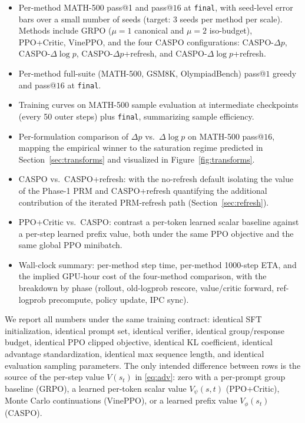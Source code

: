 \documentclass[11pt]{article}
\newcommand{\caspo}{\textsc{CASPO}}
\newcommand{\ppocritic}{PPO+Critic}
\newcommand{\grpo}{GRPO}
\newcommand{\vineppo}{VinePPO}
\begin{document}
\begin{itemize}
\item Per-method MATH-500 pass@1 and pass@$16$ at \texttt{final}, with
seed-level error bars over a small number of seeds (target: 3 seeds per
method per scale). Methods include \grpo{} ($\mu{=}1$ canonical and
$\mu{=}2$ iso-budget), \ppocritic{}, \vineppo{}, and the four \caspo{}
configurations: \caspo{}-$\Delta p$, \caspo{}-$\Delta\log p$,
\caspo{}-$\Delta p$+refresh, and \caspo{}-$\Delta\log p$+refresh.
\item Per-method full-suite (MATH-500, GSM8K, OlympiadBench) pass@$1$
greedy and pass@$16$ at \texttt{final}.
\item Training curves on MATH-500 sample evaluation at intermediate
checkpoints (every 50 outer steps) plus \texttt{final}, summarizing
sample efficiency.
\item Per-formulation comparison of $\Delta p$ vs.\ $\Delta\log p$ on
MATH-500 pass@$16$, mapping the empirical winner to the saturation
regime predicted in Section~\ref{sec:transforms} and visualized in
Figure~\ref{fig:transforms}.
\item \caspo{} vs.\ \caspo{}+refresh: with the no-refresh default
isolating the value of the Phase-1 PRM and \caspo{}+refresh
quantifying the additional contribution of the iterated PRM-refresh
path (Section~\ref{sec:refresh}).
\item \ppocritic{} vs.\ \caspo{}: contrast a per-token learned scalar
baseline against a per-step learned prefix value, both under the same
PPO objective and the same global PPO minibatch.
\item Wall-clock summary: per-method step time, per-method 1000-step ETA,
and the implied GPU-hour cost of the four-method comparison, with the
breakdown by phase (rollout, old-logprob rescore, value/critic forward,
ref-logprob precompute, policy update, IPC sync).
\end{itemize}

We report all numbers under the same training contract: identical SFT
initialization, identical prompt set, identical verifier, identical
group/response budget, identical PPO clipped objective, identical KL
coefficient, identical advantage standardization, identical max sequence
length, and identical evaluation sampling parameters. The only intended
difference between rows is the source of the per-step value $V(s_t)$ in
\eqref{eq:adv}: zero with a per-prompt group baseline (\grpo{}), a learned
per-token scalar value $V_\psi(s,t)$ (\ppocritic{}), Monte Carlo
continuations (\vineppo{}), or a learned prefix value $V_\phi(s_t)$
(\caspo{}).
\end{document}
